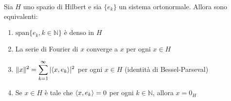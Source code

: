\begin{theorem}\label{thm:conv_Fourier}
    Sia \(H\) uno spazio di Hilbert e sia \(\{e_{k}\} \) un sistema ortonormale.
    Allora sono equivalenti:
    \begin{enumerate}[label = \textit{\roman*)}]
    \item \(\mathrm{span} \{e_{k}, k \in \mathbb{N}\} \) è denso in \(H\) 
    \item La serie di Fourier di \(x\) converge a \(x\) per ogni \(x \in H\)
    \item \(\displaystyle \|x\|^2 = \sum_{k=1}^{\infty} |{\left\langle x, e_{k}\right\rangle} |^2 \)
        per ogni \(x \in H\) (identità di Bessel-Parseval)
    \item Se \(x \in H\) è tale che \({\left\langle x, e_{k}\right\rangle} = 0\) per ogni \(k \in
        \mathbb{N}\), allora \(x = 0_H\) 
\end{enumerate}
\end{theorem}
